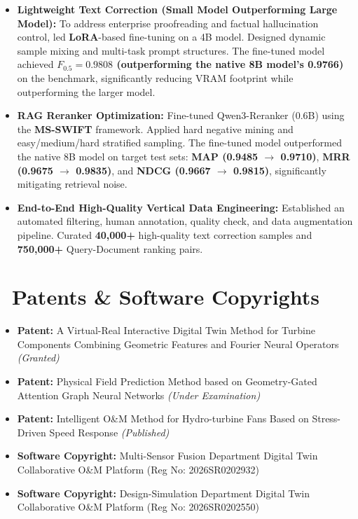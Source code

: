 \documentclass[11pt]{article}
\begin{document}
\begin{itemize}
    \item \textbf{Lightweight Text Correction (Small Model Outperforming Large Model):}
    To address enterprise proofreading and factual hallucination control, led \textbf{LoRA}-based fine-tuning on a 4B model. Designed dynamic sample mixing and multi-task prompt structures. The fine-tuned model achieved \textbf{$F_{0.5} = 0.9808$ (outperforming the native 8B model's 0.9766)} on the benchmark, significantly reducing VRAM footprint while outperforming the larger model.
    \item \textbf{RAG Reranker Optimization:}
    Fine-tuned Qwen3-Reranker (0.6B) using the \textbf{MS-SWIFT} framework. Applied hard negative mining and easy/medium/hard stratified sampling. The fine-tuned model outperformed the native 8B model on target test sets: \textbf{MAP (0.9485 $\to$ 0.9710)}, \textbf{MRR (0.9675 $\to$ 0.9835)}, and \textbf{NDCG (0.9667 $\to$ 0.9815)}, significantly mitigating retrieval noise.
    \item \textbf{End-to-End High-Quality Vertical Data Engineering:}
    Established an automated filtering, human annotation, quality check, and data augmentation pipeline. Curated \textbf{40,000+} high-quality text correction samples and \textbf{750,000+} Query-Document ranking pairs.
\end{itemize}

\section{%
    \makebox[\widthof{\faTrophy}][c]%
    {\color{CVBlue}\faTrophy}\ Patents \& Software Copyrights%
}
\begin{itemize}
    \item \textbf{Patent:} A Virtual-Real Interactive Digital Twin Method for Turbine Components Combining Geometric Features and Fourier Neural Operators \textit{(Granted)}
    \item \textbf{Patent:} Physical Field Prediction Method based on Geometry-Gated Attention Graph Neural Networks \textit{(Under Examination)}
    \item \textbf{Patent:} Intelligent O\&M Method for Hydro-turbine Fans Based on Stress-Driven Speed Response \textit{(Published)}
    \item \textbf{Software Copyright:} Multi-Sensor Fusion Department Digital Twin Collaborative O\&M Platform (Reg No: 2026SR0202932)
    \item \textbf{Software Copyright:} Design-Simulation Department Digital Twin Collaborative O\&M Platform (Reg No: 2026SR0202550)
\end{itemize}
\end{document}
